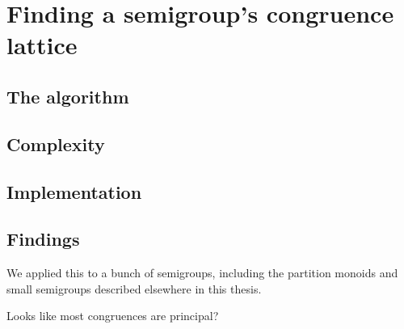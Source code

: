 \chapter{Finding a semigroup's congruence lattice}
\label{chap:lattice}

\lipsum[3]

\section{The algorithm}

\section{Complexity}

\section{Implementation}

\section{Findings}
We applied this to a bunch of semigroups, including the partition monoids and
small semigroups described elsewhere in this thesis.

Looks like most congruences are principal?
